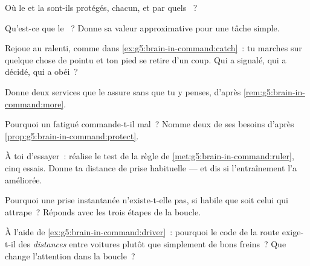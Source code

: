 \begin{exercise}[$\star$]\label{exo:g5:brain-in-command:3}
Où le  et la  sont-ils protégés, chacun, et
par quels ~?
\end{exercise}

\begin{exercise}[$\star$]\label{exo:g5:brain-in-command:4}
Qu'est-ce que le ~? Donne sa valeur approximative
pour une tâche simple.
\end{exercise}

\begin{exercise}[$\star$]\label{exo:g5:brain-in-command:5}
Rejoue au ralenti, comme dans
\cref{ex:g5:brain-in-command:catch}~: tu marches sur quelque chose
de pointu et ton pied se retire d'un coup. Qui a signalé, qui a
décidé, qui a obéi~?
\end{exercise}

\begin{exercise}[$\star$]\label{exo:g5:brain-in-command:6}
Donne deux services que le  assure sans que tu y penses,
d'après \cref{rem:g5:brain-in-command:more}.
\end{exercise}

\begin{exercise}[$\star$]\label{exo:g5:brain-in-command:7}
Pourquoi un  fatigué commande-t-il mal~? Nomme deux de ses
besoins d'après \cref{prop:g5:brain-in-command:protect}.
\end{exercise}

\begin{exercise}[$\star$]\label{exo:g5:brain-in-command:8}
À toi d'essayer~: réalise le test de la règle de
\cref{met:g5:brain-in-command:ruler}, cinq essais. Donne ta distance
de prise habituelle --- et dis si l'entraînement l'a améliorée.
\end{exercise}

\begin{exercise}[$\star\star$]\label{exo:g5:brain-in-command:9}
Pourquoi une prise instantanée n'existe-t-elle pas, si habile que
soit celui qui attrape~? Réponds avec les trois étapes de la boucle.
\end{exercise}

\begin{exercise}[$\star\star$]\label{exo:g5:brain-in-command:10}
À l'aide de \cref{ex:g5:brain-in-command:driver}~: pourquoi le code
de la route exige-t-il des \emph{distances} entre voitures plutôt
que simplement de bons freins~? Que change l'attention dans la
boucle~?
\end{exercise}

